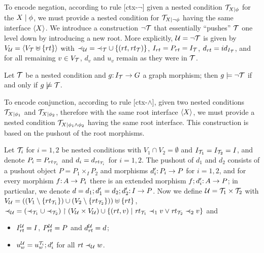 To encode negation, according to rule [ctx-$\neg$] given a {\proper} nested condition ${\mathcal{T}}_{{X} \mid {\phi}}$ for the {\cfor} ${X} \mid {\phi}$, we must provide a {\proper} nested condition for ${\mathcal{T}}_{{X} \mid {\neg \phi}}$ having the same interface $\langle X\rangle$. We introduce a construction $\neg{\mathcal{T}}$ that essentially ``pushes'' ${\mathcal{T}}$ one level down by introducing a new root.
More explicitly, ${\mathcal{U}}=\neg{\mathcal{T}}$ is given by $V_{\mathcal{U}}=\langle V_{\mathcal{T}}\uplus\{{rt}\}\rangle$ with ${\parentof[\cU]}= {\parentof[\cT]}\cup \setof{(rt,\rtof\cT)}$, $I_{rt} = P_{rt} = I_{\mathcal{T}}$, 
$d_{rt} = id_{I_{\mathcal{T}}}$,  and 
for all remaining $v\in V_{\mathcal{T}}$, $d_v$ and $u_v$ remain as they were in ${\mathcal{T}}$.

\begin{proposition}
	\label{pr:negation satisfaction}
Let ${\mathcal{T}}$ be a {\proper} nested condition and $g{:}\, I_{\mathcal{T}}\rightarrow G$ a graph morphism; then $g\models \neg{\mathcal{T}}$ if and only if $g\not\models{\mathcal{T}}$.
\end{proposition}

To encode conjunction, according to rule [ctx-$\wedge$], given two {\proper} nested conditions ${\mathcal{T}}_{{X} \mid {\phi_1}}$ and ${\mathcal{T}}_{{X} \mid {\phi_2}}$, therefore with the same root interface $\langle X\rangle$, we must provide a {\proper} nested condition ${\mathcal{T}}_{{X} \mid {\phi_1 \wedge \phi_2}}$ having the same root interface.
This construction is based on the pushout of the root morphisms. 

Let ${\mathcal{T}}_i$ for $i=1,2$ be {\proper} nested conditions with $V_1\cap V_2= \emptyset $ and $I_{{\mathcal{T}}_1}=I_{{\mathcal{T}}_2}=I$, and denote $P_i=P_{rt_{{\mathcal{T}}_i}}$ and $d_i=d_{\mathit{rt}_{{\mathcal{T}}_i}}$ for $i=1,2$. The pushout of $d_1$ and $d_2$ consists of a pushout object $P=P_1\times_I P_2$ and morphisms $d'_i{:}\, P_i\rightarrow P$ for $i=1,2$, and for every morphism $f{:}\, A\rightarrow P_i$ there is an extended morphism $f;d'_i{:}\, A\rightarrow P$; in particular, we denote $d=d_1;d'_1=d_2;d'_2{:}\, I\rightarrow P$.  Now we define ${\mathcal{U}}={\mathcal{T}}_1\times {\mathcal{T}}_2$ with $V_{\mathcal{U}}=((V_1\setminus \{{rt_{{\mathcal{T}}_1}}\})\cup (V_2\setminus \{{rt_{{\mathcal{T}}_2}}\})) \uplus \{{rt}\}$,
${\parentof[\cU]}= ({\parentof[\cT_1]}\cup {\parentof[\cT_2]})\restr (V_\cU \times V_\cU) \cup \{(rt, v) \mid \rt_{\cT_1}\parentof[1] v \vee \rt_{\cT_2}\parentof[2] v\}$ and
%
\begin{itemize}
\item $I^{\mathcal{U}}_{\mathit{rt}}=I$, $P^{\mathcal{U}}_{\mathit{rt}}=P$ and $d^{\mathcal{U}}_{\mathit{rt}}=d$;
\item $u^{\mathcal{U}}_w=u^{{\mathcal{T}}_i}_w;d'_i$ for all $\rt \parentof[\cU] w$.
\end{itemize}

